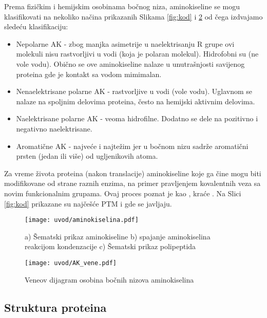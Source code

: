 Prema fizičkim i hemijskim osobinama bočnog niza, aminokiseline se mogu
klasifikovati na nekoliko načina prikazanih Slikama \ref{fig:kod} i
\ref{fig:AK_vene} od čega izdvajamo sledeću klasifikaciju:
\begin{itemize}
  \item Nepolarne AK -
    zbog manjka asimetrije u naelektrisanju R grupe ovi molekuli nisu
    rastvorljivi u vodi (koja je polaran molekul). Hidrofobni su (ne vole
    vodu).  Obično se ove aminokiseline nalaze u unutrašnjosti savijenog proteina gde
    je kontakt sa vodom mimimalan.
    
  \item Nenaelektrisane polarne AK -
    rastvorljive u vodi (vole vodu). Uglavnom se nalaze na spoljnim
    delovima proteina, često na hemijski aktivnim delovima.

  \item Naelektrisane polarne AK -
    veoma hidrofilne. Dodatno se dele na pozitivno i negativno naelektrisane.

  \item Aromatične AK - najveće i najtežim jer u bočnom nizu sadrže 
    aromatični prsten (jedan ili više) od ugljenikovih atoma.
\end{itemize}

Za vreme života proteina (nakon translacije) aminokiseline koje ga čine mogu
biti modifikovane od strane raznih enzima, na primer pravljenjem kovalentnih
veza sa novim funkcionalnim grupama. Ovaj proces poznat je kao
, kraće .  Na Slici
\ref{fig:kod} prikazane su najčešće PTM i gde se javljaju.

\begin{figure}[th]
\centering
\texttt{[image: uvod/aminokiselina.pdf]}
\caption {a) Šematski prikaz aminokiseline
b) spajanje aminokiselina reakcijom kondenzacije
c) Šematski prikaz polipeptida
}
\label{fig:AK}
\end{figure}


\begin{figure}[th]
\centering
\texttt{[image: uvod/AK\_vene.pdf]}
\caption {Veneov dijagram osobina bočnih nizova aminokiselina}
\label{fig:AK_vene}
\end{figure}

\clearpage


\subsection{Struktura proteina}


